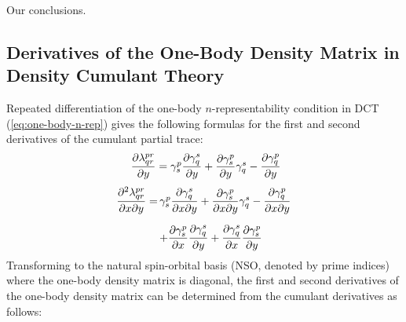 Our conclusions.

\begin{subappendices}
    \section{%
        Derivatives of the One-Body Density Matrix in Density Cumulant Theory
    }
    \label{sec:appendix}

    Repeated differentiation of the one-body \(n\)-representability condition in
    DCT (\cref{eq:one-body-n-rep}) gives the following formulas for the first
    and second derivatives of the cumulant partial trace:
    \begin{equation}
        \begin{array}{r@{\,}l}
            \dfrac{\partial \lambda^{pr}_{qr}}{\partial{y}}
            =
            \gamma^p_s
            \dfrac{\partial \gamma^s_q}{\partial{y}}
            +
            \dfrac{\partial \gamma^p_s}{\partial{y}}
            \gamma^s_q
            -
            \dfrac{\partial \gamma^p_q}{\partial{y}}
        \end{array}
    \end{equation}
    \begin{equation}
        \begin{array}{r@{\,}l}
            \dfrac{\partial^2 \lambda^{pr}_{qr}}{%
                \partial{x}
                \partial{y}
            }
            =
            &
            \gamma^p_s
            \dfrac{\partial \gamma^s_q}{%
                \partial{x}
                \partial{y}
            }
            +
            \dfrac{\partial \gamma^p_s}{%
                \partial{x} \partial{y}
            }
            \gamma^s_q
            -
            \dfrac{\partial \gamma^p_q}{%
                \partial{x}
                \partial{y}
            }
            \\[15pt]
            &
            +
            \dfrac{\partial \gamma^p_s}{\partial{x}}
            \dfrac{\partial \gamma^s_q}{\partial{y}}
            +
            \dfrac{\partial \gamma^s_q}{\partial{x}}
            \dfrac{\partial \gamma^p_s}{\partial{y}}
        \end{array}
    \end{equation}
    Transforming to the natural spin-orbital basis (NSO, denoted by prime
    indices) where the one-body density matrix is diagonal, the first and second
    derivatives of the one-body density matrix can be determined from the
    cumulant derivatives as follows:
    \begin{equation}

\end{equation}
\end{subappendices}
